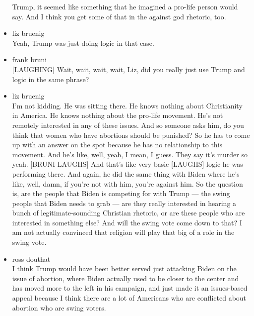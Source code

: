 \begin{itemize}
  Trump, it seemed like something that he imagined a pro-life person
  would say. And I think you get some of that in the against god
  rhetoric, too.
\item
  liz bruenig\\
  Yeah, Trump was just doing logic in that case.
\item
  frank bruni\\
  {[}LAUGHING{]} Wait, wait, wait, wait, Liz, did you really just use
  Trump and logic in the same phrase?
\item
  liz bruenig\\
  I'm not kidding. He was sitting there. He knows nothing about
  Christianity in America. He knows nothing about the pro-life movement.
  He's not remotely interested in any of these issues. And so someone
  asks him, do you think that women who have abortions should be
  punished? So he has to come up with an answer on the spot because he
  has no relationship to this movement. And he's like, well, yeah, I
  mean, I guess. They say it's murder so yeah. {[}BRUNI LAUGHS{]} And
  that's like very basic {[}LAUGHS{]} logic he was performing there. And
  again, he did the same thing with Biden where he's like, well, damn,
  if you're not with him, you're against him. So the question is, are
  the people that Biden is competing for with Trump --- the swing people
  that Biden needs to grab --- are they really interested in hearing a
  bunch of legitimate-sounding Christian rhetoric, or are these people
  who are interested in something else? And will the swing vote come
  down to that? I am not actually convinced that religion will play that
  big of a role in the swing vote.
\item
  ross douthat\\
  I think Trump would have been better served just attacking Biden on
  the issue of abortion, where Biden actually used to be closer to the
  center and has moved more to the left in his campaign, and just made
  it an issues-based appeal because I think there are a lot of Americans
  who are conflicted about abortion who are swing voters.


\end{itemize}
